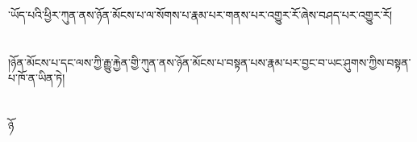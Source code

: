 ་ཡོད་པའི་ཕྱིར་ཀུན་ནས་ཉོན་མོངས་པ་ལ་སོགས་པ་རྣམ་པར་གནས་པར་འགྱུར་རོ་ཞེས་བཤད་པར་འགྱུར་རོ།\chapter{ }།ཉོན་མོངས་པ་དང་ལས་ཀྱི་རྒྱུ་རྐྱེན་གྱི་ཀུན་ནས་ཉོན་མོངས་པ་བསྟན་པས་རྣམ་པར་བྱང་བ་ཡང་ཤུགས་ཀྱིས་བསྟན་པ་ཁོ་ན་ཡིན་ཏེ།\chapter{ }ཉོ